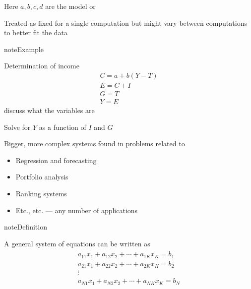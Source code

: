 \documentclass[letterpaper,10pt,english]{jupyterBook}
\begin{document}
\sphinxAtStartPar
Here \(a, b, c, d\) are the model  or 

\sphinxAtStartPar
Treated as fixed for a single computation but might vary between computations to better fit the data

\begin{sphinxadmonition}{note}{Example}

\sphinxAtStartPar
Determination of income
\begin{equation*}
\begin{split}
C = a + b(Y - T)
\\
E = C + I
\\
G = T
\\
Y = E
%
\end{split}
\end{equation*}
\sphinxAtStartPar
{} discuss what the variables are

\sphinxAtStartPar
Solve for \(Y\) as a function of \(I\) and \(G\)
\end{sphinxadmonition}

\sphinxAtStartPar
Bigger, more complex systems found in problems related to
\begin{itemize}
\item {} 
\sphinxAtStartPar
Regression and forecasting

\item {} 
\sphinxAtStartPar
Portfolio analysis

\item {} 
\sphinxAtStartPar
Ranking systems

\item {} 
\sphinxAtStartPar
Etc., etc. — any number of applications

\end{itemize}

\begin{sphinxadmonition}{note}{Definition}

\sphinxAtStartPar
A general system of equations can be written as
\begin{equation*}
\begin{split}
\begin{array}{c}
a_{11} x_1 + a_{12} x_2 + \cdots + a_{1K} x_K = b_1 \\
a_{21} x_1 + a_{22} x_2 + \cdots + a_{2K} x_K = b_2 \\
\vdots \\
a_{N1} x_1 + a_{N2} x_2 + \cdots + a_{NK} x_K = b_N 
\end{array}
\end{split}
\end{equation*}\end{sphinxadmonition}
\end{document}
